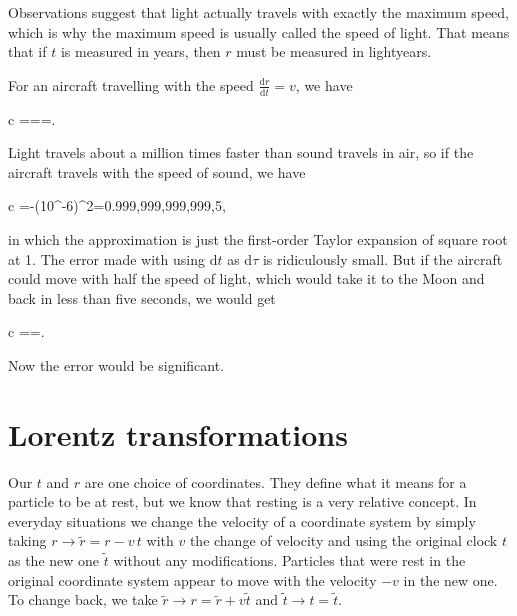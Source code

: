 \documentclass[11pt,oneside%
]{memoir}
\newenvironment{eqna}{\begin{IEEEeqnarray*}{c}}{\end{IEEEeqnarray*}\ignorespacesafterend}
\newcommand{\der}[2]{\frac{\dd#1}{\dd#2}}
\newcommand{\dd}{\mathrm{d}}
\begin{document}
Observations suggest that light actually travels with exactly the maximum speed, which is why the maximum speed is usually called the speed of light. That means that if \(t\) is measured in years, then \(r\) must be measured in lightyears.

For an aircraft travelling with the speed \(\der{r}{t}=v\), we have
\begin{eqna}
\der{\tau}{t}=\frac{\sqrt{\dd t^2-\dd r^2}}{\dd t^2}=\sqrt{1-\left(\der{r}{t}\right)^2}=.
\end{eqna}
Light travels about a million times faster than sound travels in air, so if the aircraft travels with the speed of sound, we have
\begin{eqna}
\der{\tau}{t}=-\left(10^{-6}\right)^2=0.999,999,999,999,5,
\end{eqna}
in which the approximation is just the first-order Taylor expansion of square root at 1. The error made with using \(\dd t\) as \(\dd\tau\) is ridiculously small. But if the aircraft could move with half the speed of light, which would take it to the Moon and back in less than five seconds, we would get
\begin{eqna}
\der{\tau}{t}==.
\end{eqna}
Now the error would be significant.





\section{Lorentz transformations}

Our \(t\) and \(r\) are one choice of coordinates. They define what it means for a particle to be at rest, but we know that resting is a very relative concept. In everyday situations we change the velocity of a coordinate system by simply taking \(r\rightarrow \tilde{r}=r-v\,t\) with \(v\) the change of velocity and using the original clock \(t\) as the new one \(\tilde{t}\) without any modifications. Particles that were rest in the original coordinate system appear to move with the velocity \(-v\) in the new one. To change back, we take \(\tilde{r}\rightarrow r=\tilde{r}+v\tilde{t}\) and \(\tilde{t}\rightarrow t=\tilde{t}\).
\end{document}
